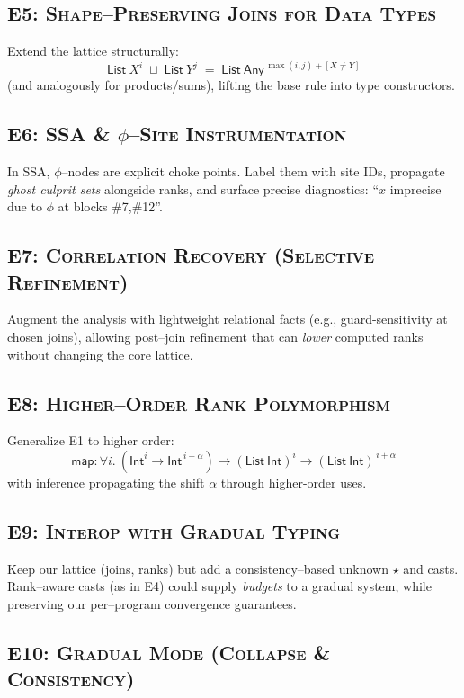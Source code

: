 \subsection{\textsc{E5: Shape–Preserving Joins for Data Types}}
Extend the lattice structurally:
\[
\textsf{List}\ X^{i} \;\sqcup\; \textsf{List}\ Y^{j}
\;=\; \textsf{List}\ \textsf{Any}^{\,\max(i,j)+[X\neq Y]}
\]
(and analogously for products/sums), lifting the base rule into type constructors.

\subsection{\textsc{E6: SSA \& \texorpdfstring{$\phi$}{phi}–Site Instrumentation}}
In SSA, $\phi$–nodes are explicit choke points.
Label them with site IDs, propagate \emph{ghost culprit sets} alongside ranks, and surface precise diagnostics:
“$x$ imprecise due to $\phi$ at blocks \#7,\#12”.

\subsection{\textsc{E7: Correlation Recovery (Selective Refinement)}}
Augment the analysis with lightweight relational facts (e.g., guard-sensitivity at chosen joins),
allowing post–join refinement that can \emph{lower} computed ranks without changing the core lattice.

\subsection{\textsc{E8: Higher–Order Rank Polymorphism}}
Generalize \textsc{E1} to higher order:
\[
\textsf{map} : \forall i.\ (\textsf{Int}^{i}\!\to\!\textsf{Int}^{\,i+\alpha}) \to
(\textsf{List}\ \textsf{Int})^{i} \to (\textsf{List}\ \textsf{Int})^{\,i+\alpha}
\]
with inference propagating the shift $\alpha$ through higher-order uses.

\subsection{\textsc{E9: Interop with Gradual Typing}}
Keep our lattice (joins, ranks) but add a consistency–based unknown $\star$ and casts.
Rank–aware casts (as in \textsc{E4}) could supply \emph{budgets} to a gradual system, while preserving our per–program convergence guarantees.

\subsection{\textsc{E10: Gradual Mode (Collapse \& Consistency)}}

